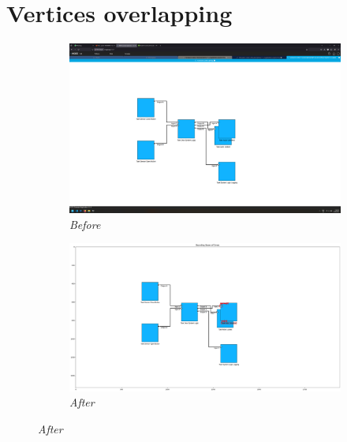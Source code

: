 \documentclass{article}
\begin{document}
\section{Vertices overlapping}
\begin{figure}[H]
    \centering
    \begin{subfigure}[t]{0.9\textwidth}
        \centering
        \includegraphics[width=\textwidth]{testcases/vertices_overlapping/135655-256834_input_image.png}
        \caption*{\textit{Before}}
    \end{subfigure}
    \newline
    \begin{subfigure}[t]{0.9\textwidth}
        \centering
        \includegraphics[width=\textwidth]{testcases/vertices_overlapping/135714-844562_element_bbox_errors_labeled_colored.png}
        \caption*{\textit{After}}
    \end{subfigure}
    \label{fig:vertices_overlapping}
\end{figure}
\newpage
\end{document}
